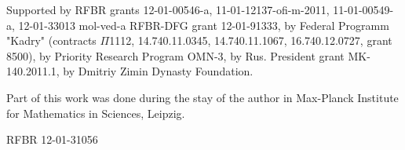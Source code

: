 Supported by RFBR grants 12-01-00546-a, 11-01-12137-ofi-m-2011, 11-01-00549-a, 12-01-33013 mol-ved-a 
RFBR-DFG grant 12-01-91333, by Federal Programm "Kadry" (contracts $\Pi$1112, 14.740.11.0345, 14.740.11.1067, 16.740.12.0727,
grant 8500),  by Priority Research Program OMN-3,                                                                                                                                                                                                                         %
by Rus. President grant MK-140.2011.1, by Dmitriy Zimin Dynasty
Foundation. %

Part of this work was done during the stay of the author
in Max-Planck Institute for Mathematics in Sciences, Leipzig. %

RFBR 12-01-31056 %


